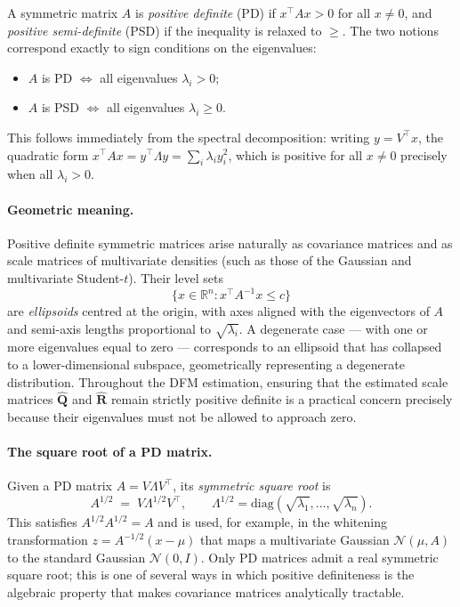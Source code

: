 \documentclass[11pt, a4paper, oneside]{article}
\begin{document}
A symmetric matrix $A$ is \emph{positive definite} (PD) if
$x^{\top} A x > 0$ for all $x \neq 0$, and \emph{positive semi-definite}
(PSD) if the inequality is relaxed to $\geq$. The two notions
correspond exactly to sign conditions on the eigenvalues:
\begin{itemize}[leftmargin=1.5em, itemsep=2pt]
    \item $A$ is PD $\iff$ all eigenvalues $\lambda_i > 0$;
    \item $A$ is PSD $\iff$ all eigenvalues $\lambda_i \geq 0$.
\end{itemize}
This follows immediately from the spectral decomposition: writing
$y = V^{\top} x$, the quadratic form $x^{\top} A x = y^{\top} \Lambda y = \sum_i \lambda_i y_i^2$,
which is positive for all $x \neq 0$ precisely when all $\lambda_i > 0$.

\paragraph{Geometric meaning.}
Positive definite symmetric matrices arise naturally as covariance
matrices and as scale matrices of multivariate densities (such as
those of the Gaussian and multivariate Student-$t$). Their level sets
\[
\{x \in \mathbb{R}^n : x^{\top} A^{-1} x \leq c\}
\]
are \emph{ellipsoids} centred at the origin, with axes aligned with
the eigenvectors of $A$ and semi-axis lengths proportional to
$\sqrt{\lambda_i}$. A degenerate case — with one or more eigenvalues
equal to zero — corresponds to an ellipsoid that has collapsed to a
lower-dimensional subspace, geometrically representing a degenerate
distribution. Throughout the DFM estimation, ensuring that the
estimated scale matrices $\hat{\mathbf{Q}}$ and $\hat{\mathbf{R}}$
remain strictly positive definite is a practical concern precisely
because their eigenvalues must not be allowed to approach zero.

\paragraph{The square root of a PD matrix.}
Given a PD matrix $A = V \Lambda V^{\top}$, its \emph{symmetric square
root} is
\[
A^{1/2} \;=\; V \Lambda^{1/2} V^{\top},
\qquad
\Lambda^{1/2} = \mathrm{diag}(\sqrt{\lambda_1}, \ldots, \sqrt{\lambda_n}).
\]
This satisfies $A^{1/2} A^{1/2} = A$ and is used, for example, in the
whitening transformation $z = A^{-1/2}(x - \mu)$ that maps a
multivariate Gaussian $\mathcal{N}(\mu, A)$ to the standard Gaussian
$\mathcal{N}(0, I)$. Only PD matrices admit a real symmetric square
root; this is one of several ways in which positive definiteness is
the algebraic property that makes covariance matrices analytically
tractable.
\end{document}
